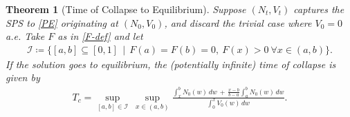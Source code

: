 \documentclass[11pt]{article}
\newtheorem{thm}{Theorem}[section]
\numberwithin{equation}{section}
\begin{document}
\begin{thm}[Time of Collapse to Equilibrium]
    Suppose $(N_t,V_t)$ captures the SPS to \eqref{PE} originating at $(N_0,V_0)$, and discard the trivial case where $V_0=0$ a.e. Take $F$ as in \eqref{F-def} and let 
    \begin{align*}
        \mathcal I\coloneq\{[a,b]\subseteq [0,1] \ \ | \ \ F(a)=F(b)=0, \ F(x)>0\ \forall x\in(a, b)\}.
    \end{align*}
    If the solution goes to equilibrium, the (potentially infinite) time of collapse is given by 
    \begin{align}\label{time-to-collapse}
        T_c=\sup_{[a,b]\in\mathcal I}~\sup_{x\in (a,b)}\frac{\displaystyle\int_x^b N_0(w) \, dw \, + \, \frac{x-b}{b-a}\int_a^b N_0(w) \, dw}{\displaystyle\int_0^x V_0(w) \, dw}. 
    \end{align}
\end{thm}
\end{document}
